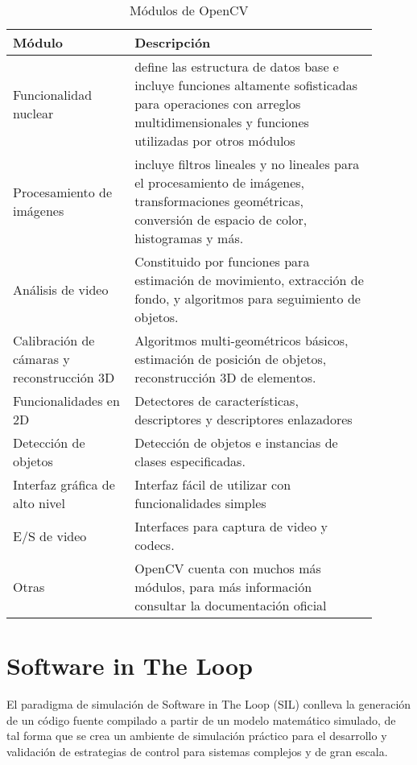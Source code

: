 \begin{table}[ht]
    \centering
    \begin{tabular}{p{0.3\linewidth}p{0.6\linewidth}}
        \hline
        \textbf{Módulo} & \textbf{Descripción}\\ \hline \hline
        Funcionalidad nuclear & define las estructura de datos base e incluye funciones altamente sofisticadas para operaciones con arreglos multidimensionales y funciones utilizadas por otros módulos \\ \hline
        Procesamiento de imágenes & incluye filtros lineales y no lineales para el procesamiento de imágenes, transformaciones geométricas, conversión de espacio de color, histogramas y más.\\ \hline
        Análisis de video & Constituido por funciones para estimación de movimiento, extracción de fondo, y algoritmos para seguimiento de objetos.\\ \hline
        Calibración de cámaras y reconstrucción 3D & Algoritmos multi-geométricos básicos, estimación de posición de objetos, reconstrucción  3D de elementos.\\ \hline
        Funcionalidades en 2D &  Detectores de características, descriptores y descriptores enlazadores\\ \hline
        Detección de objetos & Detección de objetos e instancias de clases especificadas.\\ \hline
        Interfaz gráfica de alto nivel & Interfaz fácil de utilizar con funcionalidades simples\\ \hline
        E/S de video & Interfaces para captura de video y codecs.\\ \hline 
        Otras & OpenCV cuenta con muchos más módulos, para más información consultar la documentación oficial \cite{OpenCV}\\ \hline \hline
    \end{tabular}
    \caption{Módulos de OpenCV}
    \label{tab:OpenCV}
\end{table}

\section{Software in The Loop}

El paradigma de simulación de Software in The Loop (SIL) conlleva la generación de un código fuente compilado a partir de un modelo matemático simulado, de tal forma que se crea un ambiente de simulación práctico para el desarrollo y validación de estrategias de control para sistemas complejos y de gran escala. 

